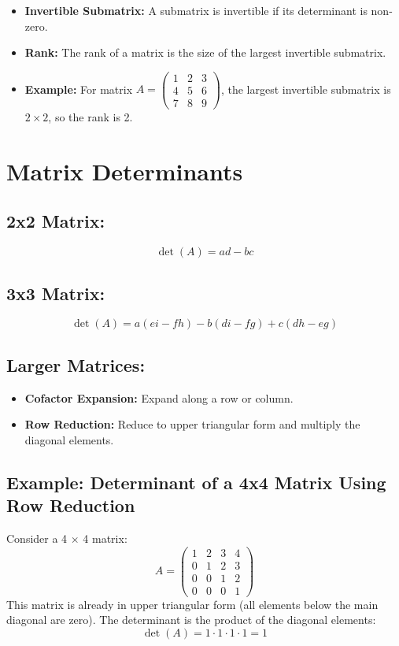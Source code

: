 \documentclass{article}
\begin{document}
\begin{itemize}[left=0pt]
    \item \textbf{Invertible Submatrix:} A submatrix is invertible if its determinant is non-zero.
    \item \textbf{Rank:} The rank of a matrix is the size of the largest invertible submatrix.
    \item \textbf{Example:} For matrix \( A = \begin{pmatrix} 1 & 2 & 3 \\ 4 & 5 & 6 \\ 7 & 8 & 9 \end{pmatrix} \), the largest invertible submatrix is \( 2 \times 2 \), so the rank is 2.
\end{itemize}




\section*{Matrix Determinants}

\subsection*{2x2 Matrix:} 
\[
\det(A) = ad - bc
\]

\subsection*{3x3 Matrix:} 
\[
\det(A) = a(ei - fh) - b(di - fg) + c(dh - eg)
\]

\subsection*{Larger Matrices:}
\begin{itemize}
    \item \textbf{Cofactor Expansion:} Expand along a row or column.
    \item \textbf{Row Reduction:} Reduce to upper triangular form and multiply the diagonal elements.
\end{itemize}

\subsection*{Example: Determinant of a 4x4 Matrix Using Row Reduction}

Consider a 4 $\times$ 4 matrix:
\[
A = \begin{pmatrix}
1 & 2 & 3 & 4 \\
0 & 1 & 2 & 3 \\
0 & 0 & 1 & 2 \\
0 & 0 & 0 & 1 
\end{pmatrix}
\]
This matrix is already in upper triangular form (all elements below the main diagonal are zero). The determinant is the product of the diagonal elements:
\[
\det(A) = 1 \cdot 1 \cdot 1 \cdot 1 = 1
\]
\end{document}
